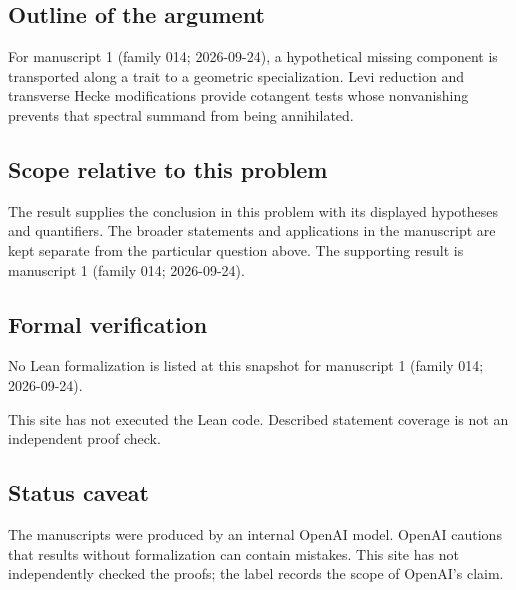 \documentclass[11pt]{article}
\begin{document}
\subsection{Outline of the argument}
For manuscript 1 (family 014; 2026-09-24), a hypothetical missing component is transported along a trait to a geometric specialization. Levi reduction and transverse Hecke modifications provide cotangent tests whose nonvanishing prevents that spectral summand from being annihilated.

\subsection{Scope relative to this problem}
The result supplies the conclusion in this problem with its displayed hypotheses and quantifiers. The broader statements and applications in the manuscript are kept separate from the particular question above. The supporting result is manuscript 1 (family 014; 2026-09-24).

\subsection{Formal verification}
No Lean formalization is listed at this snapshot for manuscript 1 (family 014; 2026-09-24).

This site has not executed the Lean code. Described statement coverage is not an independent proof check.

\subsection{Status caveat}
The manuscripts were produced by an internal OpenAI model. OpenAI cautions that results without formalization can contain mistakes. This site has not independently checked the proofs; the label records the scope of OpenAI's claim.
\end{document}
